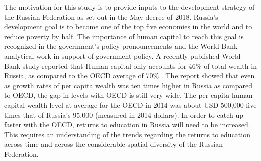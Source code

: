 \documentclass[alpha-refs]{wiley-article-04t}
\begin{document}
The motivation for this study is to provide inputs to the development 
strategy of the Russian Federation as set out in the May decree of 2018. 
Russia's development goal is to become one of the top five economies in 
the world and to reduce poverty by half. The importance of human capital to 
reach this goal is recognized in the government's policy pronouncements and 
the World Bank analytical work in support of government policy. 
A recently published World Bank study reported that Human capital  only 
accounts for 46\% of total wealth in Russia, as compared to the OECD 
average of 70\% \parencite{Naikal2019}. The report showed that even as 
growth rates of per capita  wealth was ten times higher in Russia as 
compared to OECD, the gap in levels with OECD is still very wide. The per 
capita human capital wealth  level at average for the OECD in 2014 was 
about USD 500,000 \textendash  five times that of Russia's 95,000 (measured 
in  2014 dollars). In order to catch up faster with the OECD, returns to 
education  in Russia will need to be increased. This requires an 
understanding of the trends regarding the returns to education across time 
and across the considerable spatial diversity of the Russian Federation. 

\vspace{1em}

\noindent{}


\vspace{1em}
\end{document}
